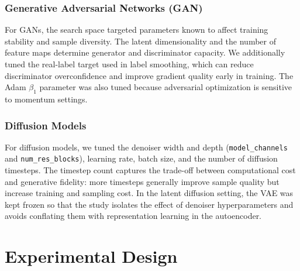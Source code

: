 \documentclass[runningheads]{llncs}
\begin{document}
\subsubsection{Generative Adversarial Networks (GAN)}
For GANs, the search space targeted parameters known to affect training 
stability and sample diversity. The latent dimensionality and the number of 
feature maps determine generator and discriminator capacity. We additionally 
tuned the real-label target used in label smoothing, which can reduce 
discriminator overconfidence and improve gradient quality early in training. 
The Adam $\beta_1$ parameter was also tuned because adversarial optimization 
is sensitive to momentum settings.

\subsubsection{Diffusion Models}
For diffusion models, we tuned the denoiser width and depth 
(\texttt{model\_channels} and \texttt{num\_res\_blocks}), learning rate, 
batch size, and the number of diffusion timesteps. The timestep count 
captures the trade-off between computational cost and generative fidelity: 
more timesteps generally improve sample quality but increase training and 
sampling cost. In the latent diffusion setting, the VAE was kept frozen so 
that the study isolates the effect of denoiser hyperparameters and avoids 
conflating them with representation learning in the autoencoder.



\section{Experimental Design}
\end{document}
